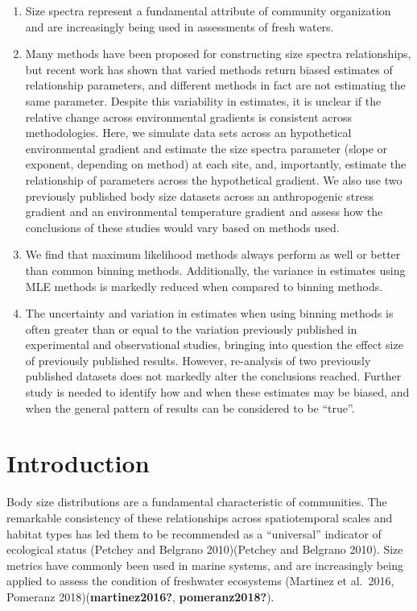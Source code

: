 \documentclass[
]{article}
\providecommand{\tightlist}{%
  \setlength{\itemsep}{0pt}\setlength{\parskip}{0pt}}
\begin{document}
\begin{enumerate}
\def\labelenumi{\arabic{enumi}.}
\tightlist
\item
  Size spectra represent a fundamental attribute of community
  organization and are increasingly being used in assessments of fresh
  waters.
\item
  Many methods have been proposed for constructing size spectra
  relationships, but recent work has shown that varied methods return
  biased estimates of relationship parameters, and different methods in
  fact are not estimating the same parameter. Despite this variability
  in estimates, it is unclear if the relative change across
  environmental gradients is consistent across methodologies. Here, we
  simulate data sets across an hypothetical environmental gradient and
  estimate the size spectra parameter (slope or exponent, depending on
  method) at each site, and, importantly, estimate the relationship of
  parameters across the hypothetical gradient. We also use two
  previously published body size datasets across an anthropogenic stress
  gradient and an environmental temperature gradient and assess how the
  conclusions of these studies would vary based on methods used.
\item
  We find that maximum likelihood methods always perform as well or
  better than common binning methods. Additionally, the variance in
  estimates using MLE methods is markedly reduced when compared to
  binning methods.
\item
  The uncertainty and variation in estimates when using binning methods
  is often greater than or equal to the variation previously published
  in experimental and observational studies, bringing into question the
  effect size of previously published results. However, re-analysis of
  two previously published datasets does not markedly alter the
  conclusions reached. Further study is needed to identify how and when
  these estimates may be biased, and when the general pattern of results
  can be considered to be ``true''.
\end{enumerate}

\hypertarget{introduction}{%
\section{Introduction}\label{introduction}}

Body size distributions are a fundamental characteristic of communities.
The remarkable consistency of these relationships across spatiotemporal
scales and habitat types has led them to be recommended as a
``universal'' indicator of ecological status (Petchey and Belgrano
2010)(Petchey and Belgrano 2010). Size metrics have commonly been used
in marine systems, and are increasingly being applied to assess the
condition of freshwater ecosystems (Martinez et al.~2016, Pomeranz
2018)(\textbf{martinez2016?}, \textbf{pomeranz2018?}).
\end{document}
